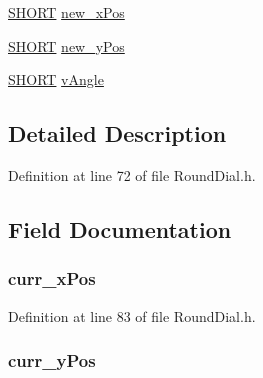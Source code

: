 \begin{DoxyCompactItemize}
\item 
\hyperlink{_generic_type_defs_8h_ae9bb25d3afecf3bfab0fbe3c22c2050f}{S\+H\+O\+R\+T} \hyperlink{struct_r_o_u_n_d_d_i_a_l_afa74eab00bfed86dc0bdc5c3e694ba66}{new\+\_\+x\+Pos}
\item 
\hyperlink{_generic_type_defs_8h_ae9bb25d3afecf3bfab0fbe3c22c2050f}{S\+H\+O\+R\+T} \hyperlink{struct_r_o_u_n_d_d_i_a_l_afd7bfd3561821f2e8aedb2f141a433ab}{new\+\_\+y\+Pos}
\item 
\hyperlink{_generic_type_defs_8h_ae9bb25d3afecf3bfab0fbe3c22c2050f}{S\+H\+O\+R\+T} \hyperlink{struct_r_o_u_n_d_d_i_a_l_a6d06b2de8d38a5dbaae387a0982d31c0}{v\+Angle}
\end{DoxyCompactItemize}


\subsection{Detailed Description}


Definition at line 72 of file Round\+Dial.\+h.



\subsection{Field Documentation}
\hypertarget{struct_r_o_u_n_d_d_i_a_l_a2cd7ce648be49a7f48c6cb087749a186}{}
\subsubsection[{curr\+\_\+x\+Pos}]{ curr\+\_\+x\+Pos}\label{struct_r_o_u_n_d_d_i_a_l_a2cd7ce648be49a7f48c6cb087749a186}


Definition at line 83 of file Round\+Dial.\+h.

\hypertarget{struct_r_o_u_n_d_d_i_a_l_a8d43efe8256594d13ee57c7b252d2ebb}{}
\subsubsection[{curr\+\_\+y\+Pos}]{ curr\+\_\+y\+Pos}\label{struct_r_o_u_n_d_d_i_a_l_a8d43efe8256594d13ee57c7b252d2ebb}


